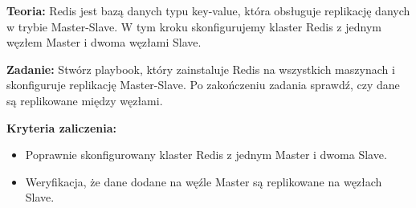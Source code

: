 \documentclass{article}
\begin{document}
\textbf{Teoria:}  
Redis jest bazą danych typu key-value, która obsługuje replikację danych w trybie Master-Slave. W tym kroku skonfigurujemy klaster Redis z jednym węzłem Master i dwoma węzłami Slave.

\textbf{Zadanie:}  
Stwórz playbook, który zainstaluje Redis na wszystkich maszynach i skonfiguruje replikację Master-Slave. Po zakończeniu zadania sprawdź, czy dane są replikowane między węzłami.

\textbf{Kryteria zaliczenia:}
\begin{itemize}
    \item Poprawnie skonfigurowany klaster Redis z jednym Master i dwoma Slave.
    \item Weryfikacja, że dane dodane na węźle Master są replikowane na węzłach Slave.
\end{itemize}
\end{document}
